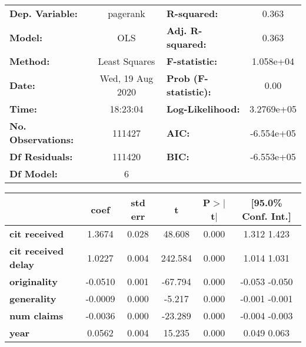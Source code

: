 \begin{center}
\begin{tabular}{lclc}
\toprule
\textbf{Dep. Variable:}     &     pagerank     & \textbf{  R-squared:         } &       0.363    \\
\textbf{Model:}             &       OLS        & \textbf{  Adj. R-squared:    } &       0.363    \\
\textbf{Method:}            &  Least Squares   & \textbf{  F-statistic:       } &   1.058e+04    \\
\textbf{Date:}              & Wed, 19 Aug 2020 & \textbf{  Prob (F-statistic):} &       0.00     \\
\textbf{Time:}              &     18:23:04     & \textbf{  Log-Likelihood:    } &   3.2769e+05   \\
\textbf{No. Observations:}  &      111427      & \textbf{  AIC:               } &   -6.554e+05   \\
\textbf{Df Residuals:}      &      111420      & \textbf{  BIC:               } &   -6.553e+05   \\
\textbf{Df Model:}          &           6      & \textbf{                     } &                \\
\bottomrule
\end{tabular}
\begin{tabular}{lccccc}
                            & \textbf{coef} & \textbf{std err} & \textbf{t} & \textbf{P$>$$|$t$|$} & \textbf{[95.0\% Conf. Int.]}  \\
\midrule
\textbf{cit received}       &       1.3674  &        0.028     &    48.608  &         0.000        &         1.312     1.423       \\
\textbf{cit received delay} &       1.0227  &        0.004     &   242.584  &         0.000        &         1.014     1.031       \\
\textbf{originality}        &      -0.0510  &        0.001     &   -67.794  &         0.000        &        -0.053    -0.050       \\
\textbf{generality}         &      -0.0009  &        0.000     &    -5.217  &         0.000        &        -0.001    -0.001       \\
\textbf{num claims}         &      -0.0036  &        0.000     &   -23.289  &         0.000        &        -0.004    -0.003       \\
\textbf{year}               &       0.0562  &        0.004     &    15.235  &         0.000        &         0.049     0.063       \\

\end{tabular}
\end{center}
